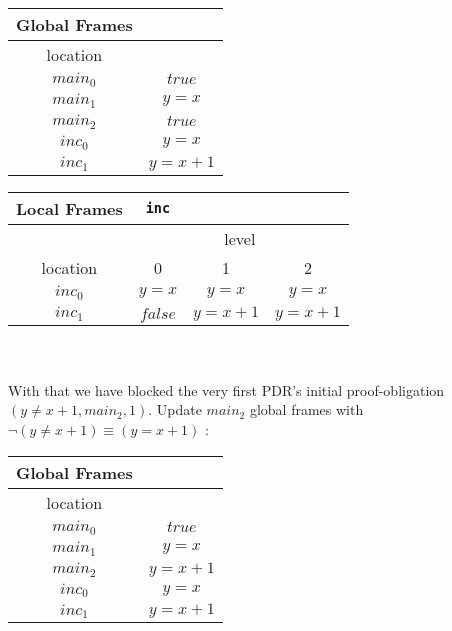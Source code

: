 \documentclass{article}
\begin{document}
	\begin{minipage}{.4\textwidth}
	\setlength\tabcolsep{0.35em}
	\begin{center}
		\begin{tabu}{cc}
			Global Frames \\
			\toprule
			location &  \\
			$main_0$ & $true$  \\
			$main_1$ & $y = x$\\
			$main_2$ & $true$ \\
			$inc_0$ & $y = x$  \\
			$inc_1$ & $y = x + 1$\\
			\bottomrule
		\end{tabu}
	\end{center}
\end{minipage}
\hfill
\begin{minipage}{.45\textwidth}
	\setlength\tabcolsep{0.35em}
	\begin{center}
		\begin{tabu}{cccc}
			Local Frames & \texttt{inc}\\
			\toprule
			& \multicolumn{3}{c}{level} \\
			\cmidrule(lr){2-4}
			location & 0 & 1 & 2\\
			\cmidrule{1-4}
			$inc_0$ & $y = x$ & $y = x$ & $y = x$  \\
			$inc_1$ & $false$ & $y = x + 1$  & $y = x + 1$\\
			\bottomrule
		\end{tabu}
	\end{center}	
\end{minipage} \\ \\

With that we have blocked the very first PDR's initial proof-obligation $(y \neq x + 1, main_2, 1)$. Update $main_2$ global frames with $\neg(y \neq x + 1) \equiv (y = x + 1)$ : \\


	\setlength\tabcolsep{0.35em}
	\begin{center}
		\begin{tabu}{cc}
			Global Frames \\
			\toprule
			location &  \\
			\cmidrule{1-2}
			$main_0$ & $true$  \\
			$main_1$ & $y = x$\\
			$main_2$ & $y = x + 1$ \\
			$inc_0$ & $y = x$  \\
			$inc_1$ & $y = x + 1$\\
			\bottomrule
		\end{tabu}
	\end{center}
\end{document}
